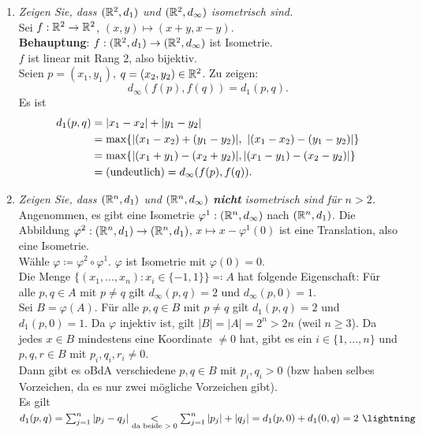 \begin{problem*}[4]
  \begin{enumerate}
    \item \emph{Zeigen Sie, dass $ (\mathbb{R}^2, d_1) $ und $ (\mathbb{R}^2, d_\infty) $ isometrisch sind.} \\
      Sei $ f : \mathbb{R}^2 \to \mathbb{R}^2 $, $ (x,y) \mapsto (x+y, x-y) $. \\
      \textbf{Behauptung}: $ f : (\mathbb{R}^2, d_1) \to (\mathbb{R}^2, d_\infty) $ ist Isometrie. \\
      $ f $ ist linear mit Rang $ 2 $, also bijektiv. \\
      Seien $ p = (x_1, y_1) $, $ q = (x_2, y_2) \in \mathbb{R}^2 $. Zu zeigen:
      \begin{equation*}
        d_\infty(f(p),f(q)) = d_1(p,q)\text{.}
      \end{equation*}
      Es ist
      \begin{align*}
        d_1(p,q) &= \vert x_1 - x_2 \vert + \vert y_1 - y_2 \vert \\
          &= \max\{ \vert (x_1-x_2) + (y_1-y_2) \vert, \ \vert (x_1 - x_2) - (y_1-y_2) \vert \} \\
          &= \max\{ \vert (x_1 + y_1) - (x_2+y_2) \vert, \vert (x_1-y_1)-(x_2-y_2) \vert \} \\
          &= \text{(undeutlich)} = d_\infty(f(p),f(q))\text{.} \quad \qed
      \end{align*}
    \item \emph{Zeigen Sie, dass $ (\mathbb{R}^n, d_1) $ und $ (\mathbb{R}^n, d_\infty) $ \textbf{nicht} isometrisch sind für $ n > 2 $.} \\
    Angenommen, es gibt eine Isometrie $ \varphi^1: (\mathbb{R}^n, d_\infty) $ nach $ (\mathbb{R}^n, d_1) $. Die Abbildung $ \varphi^2 : (\mathbb{R}^n, d_1) \to (\mathbb{R}^n, d_1) $, $ x \mapsto x - \varphi^1(0) $ ist eine Translation, also eine Isometrie. \\
    Wähle $ \varphi \coloneqq \varphi^2 \circ \varphi^1 $. $ \varphi $ ist Isometrie mit $ \varphi(0) = 0 $. \\
    Die Menge $ \{ (x_1, \dots, x_n) : x_i \in \{ -1, 1 \} \} \eqqcolon A $ hat folgende Eigenschaft: Für alle $ p, q \in A $ mit $ p \neq q $ gilt $ d_\infty(p,q) = 2 $ und $ d_\infty(p, 0) = 1 $. \\
    Sei $ B = \varphi(A) $. Für alle $ p,q \in B $ mit $ p \neq q $ gilt $ d_1(p,q) = 2 $ und $ d_1(p,0) = 1 $. Da $ \varphi $ injektiv ist, gilt $ \vert B \vert = \vert A \vert = 2^n > 2n $ (weil $ n \geq 3 $). Da jedes $ x \in B $ mindestens eine Koordinate $ \neq 0 $ hat, gibt es ein $ i \in \{ 1, \dots, n \} $ und $ p,q,r \in B $ mit $ p_i, q_i, r_i \neq 0 $. \\
    Dann gibt es oBdA verschiedene $ p,q \in B $ mit $ p_i, q_i > 0 $ (bzw haben selbes Vorzeichen, da es nur zwei mögliche Vorzeichen gibt). \\
    Es gilt $ d_1(p,q) = \sum_{j = 1}^n \vert p_j - q_j \vert \underset{\text{da beide $ > 0 $}}{<} \sum_{j = 1}^n \vert p_j \vert + \vert q_j \vert = d_1(p,0) + d_1(0,q) = 2 \ \lightning $
  \end{enumerate}
\end{problem*}

